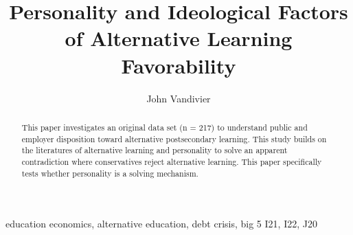 \documentclass[review]{elsarticle}
\begin{document}
\begin{frontmatter}

    \title{
        Personality and Ideological Factors of Alternative Learning Favorability
    }

    \author[mymainaddress]{John Vandivier} %
    \address[mymainaddress]{4400 University Dr, Fairfax, VA 22030}

    \begin{abstract}
        This paper investigates an original data set (n = 217) to understand public
        and employer disposition toward alternative postsecondary learning.
        This study builds on the literatures of alternative learning and personality
        to solve an apparent contradiction where conservatives reject alternative learning.
        This paper specifically tests whether personality is a solving mechanism.
    \end{abstract}

    \begin{keyword}
        education economics, alternative education, debt crisis, big 5
        \MSC[2010] I21, I22, J20 %
    \end{keyword}

\end{frontmatter}
\end{document}
